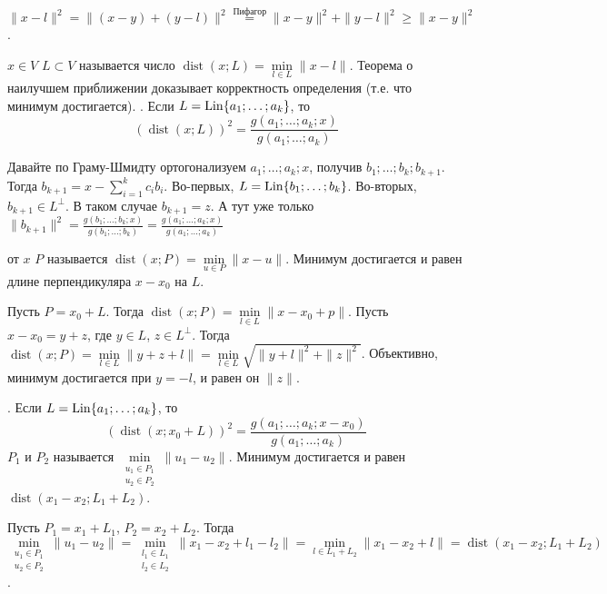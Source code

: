 \documentclass{article}
\begin{document}
\begin{itemize}
        \begin{Proof}
            $\|x-l\|^2=\|(x-y)+(y-l)\|^2\overset{\text{Пифагор}}=\|x-y\|^2+\|y-l\|^2\geqslant\|x-y\|^2$.
        \end{Proof}
        \dfn {} $x\in V$  $L\subset V$ называется число $\operatorname{dist}(x;L)=\min\limits_{l\in L}\|x-l\|$.
        \thm Теорема о наилучшем приближении доказывает корректность определения (т.е. что минимум достигается).
        \thm {}. Если $L=\operatorname{Lin}\{a_1;\ldots;a_k\}$, то
        $$
        (\operatorname{dist}(x;L))^2=\frac{g(a_1;\ldots;a_k;x)}{g(a_1;\ldots;a_k)}
        $$
        \begin{Proof}
            Давайте по Граму-Шмидту ортогонализуем $a_1;\ldots;a_k;x$, получив $b_1;\ldots;b_k;b_{k+1}$. Тогда $b_{k+1}=x-\sum\limits_{i=1}^kc_ib_i$. Во-первых, $L=\operatorname{Lin}\{b_1;\ldots;b_k\}$. Во-вторых, $b_{k+1}\in L^\perp$. В таком случае $b_{k+1}=z$. А тут уже только $\|b_{k+1}\|^2=\frac{g(b_1;\ldots;b_k;x)}{g(b_1;\ldots;b_k)}=\frac{g(a_1;\ldots;a_k;x)}{g(a_1;\ldots;a_k)}$
        \end{Proof}
        \dfn {} от $x$  $P$ называется $\operatorname{dist}(x;P)=\min\limits_{u\in P}\|x-u\|$.
        \thm Минимум достигается и равен длине перпендикуляра $x-x_0$ на $L$.
        \begin{Proof}
            Пусть $P=x_0+L$. Тогда $\operatorname{dist}(x;P)=\min\limits_{l\in L}\|x-x_0+p\|$. Пусть $x-x_0=y+z$, где $y\in L$, $z\in L^\perp$. Тогда $\operatorname{dist}(x;P)=\min\limits_{l\in L}\|y+z+l\|=\min\limits_{l\in L}\sqrt{\|y+l\|^2+\|z\|^2}$. Объективно, минимум достигается при $y=-l$, и равен он $\|z\|$.
        \end{Proof}
        \thm {}. Если $L=\operatorname{Lin}\{a_1;\ldots;a_k\}$, то
        $$
        (\operatorname{dist}(x;x_0+L))^2=\frac{g(a_1;\ldots;a_k;x-x_0)}{g(a_1;\ldots;a_k)}
        $$
        \dfn {} $P_1$ и $P_2$ называется $\min\limits_{\substack{u_1\in P_1\\u_2\in P_2}}\|u_1-u_2\|$.
        \thm Минимум достигается и равен $\operatorname{dist}(x_1-x_2;L_1+L_2)$.
        \begin{Proof}
            Пусть $P_1=x_1+L_1$, $P_2=x_2+L_2$. Тогда $\min\limits_{\substack{u_1\in P_1\\u_2\in P_2}}\|u_1-u_2\|=\min\limits_{\substack{l_1\in L_1\\l_2\in L_2}}\|x_1-x_2+l_1-l_2\|=\min\limits_{l\in L_1+L_2}\|x_1-x_2+l\|=\operatorname{dist}(x_1-x_2;L_1+L_2)$.

\end{Proof}
\end{itemize}
\end{document}

